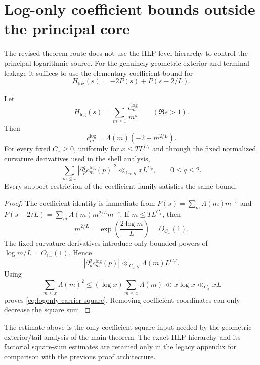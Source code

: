 \section{Log-only coefficient bounds outside the principal core}
\label{sec:logonly-source-bounds}

The revised theorem route does not use the HLP level hierarchy to control the
principal logarithmic source.  For the genuinely geometric exterior and
terminal leakage it suffices to use the elementary coefficient bound for
\[
H_{\log}(s)=-2P(s)+P(s-2/L).
\]

\begin{lemma}
\label{lem:logonly-carrier-square}
Let
\[
H_{\log}(s)=\sum_{m\ge1}\frac{c_m^{\log}}{m^s}
\qquad(\Re s>1).
\]
Then
\begin{equation}
\boxed{
c_m^{\log}=\Lambda(m)(-2+m^{2/L}).}
\label{eq:logonly-direct-coefficient}
\end{equation}
For every fixed $C_x\ge0$, uniformly for $x\le TL^{C_x}$ and through the fixed
normalized curvature derivatives used in the shell analysis,
\begin{equation}
\boxed{
\sum_{m\le x}|\partial_p^q c_m^{\log}(p)|^2
\ll_{C_x,q}xL^{C_q},
\qquad 0\le q\le2.
}
\label{eq:logonly-carrier-square}
\end{equation}
Every support restriction of the coefficient family satisfies the same bound.
\end{lemma}

\begin{proof}
The coefficient identity is immediate from
$P(s)=\sum_m\Lambda(m)m^{-s}$ and
$P(s-2/L)=\sum_m\Lambda(m)m^{2/L}m^{-s}$.  If
$m\le TL^{C_x}$, then
\[
m^{2/L}=\exp\!\left(\frac{2\log m}{L}\right)=O_{C_x}(1).
\]
The fixed curvature derivatives introduce only bounded powers of
$\log m/L=O_{C_x}(1)$.  Hence
\[
|\partial_p^q c_m^{\log}(p)|\ll_{C_x,q}\Lambda(m)L^{C_q'}.
\]
Using
\[
\sum_{m\le x}\Lambda(m)^2
\le (\log x)\sum_{m\le x}\Lambda(m)
\ll x\log x
\ll_{C_x}xL
\]
proves \eqref{eq:logonly-carrier-square}.  Removing coefficient coordinates can
only decrease the square sum.
\end{proof}

\begin{remark}
The estimate above is the only coefficient-square input needed by the
geometric exterior/tail analysis of the main theorem.  The exact HLP hierarchy
and its factorial square-sum estimates are retained only in the legacy
appendix for comparison with the previous proof architecture.
\end{remark}
